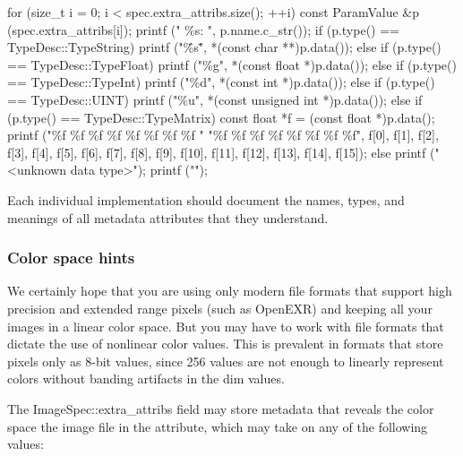 \begin{code}
        for (size_t i = 0;  i < spec.extra_attribs.size();  ++i) {
            const ParamValue &p (spec.extra_attribs[i]);
            printf ("    \%s: ", p.name.c_str());
            if (p.type() == TypeDesc::TypeString)
                printf ("\"\%s\"", *(const char **)p.data());
            else if (p.type() == TypeDesc::TypeFloat)
                printf ("\%g", *(const float *)p.data());
            else if (p.type() == TypeDesc::TypeInt)
                printf ("\%d", *(const int *)p.data());
            else if (p.type() == TypeDesc::UINT)
                printf ("\%u", *(const unsigned int *)p.data());
            else if (p.type() == TypeDesc::TypeMatrix) {
                const float *f = (const float *)p.data();
                printf ("\%f \%f \%f \%f \%f \%f \%f \%f "
                        "\%f \%f \%f \%f \%f \%f \%f \%f",
                        f[0], f[1], f[2], f[3], f[4], f[5], f[6], f[7],
                        f[8], f[9], f[10], f[11], f[12], f[13], f[14], f[15]);
            }
            else
                printf ("<unknown data type>");
            printf ("\n");
        }
\end{code}

Each individual \ImageInput implementation should document the names,
types, and meanings of all metadata attributes that they understand.

\subsubsection{Color space hints}

We certainly hope that you are using only modern file formats that
support high precision and extended range pixels (such as OpenEXR) and
keeping all your images in a linear color space.  But you may have to
work with file formats that dictate the use of nonlinear color values.
This is prevalent in formats that store pixels only as 8-bit values,
since 256 values are not enough to linearly represent colors without
banding artifacts in the dim values.

The {\cf ImageSpec::extra_attribs} field may store metadata that reveals
the color space the image file in the 
attribute, which may take on any of the following values:

